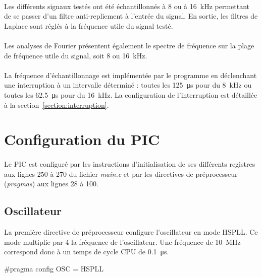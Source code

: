 \documentclass{article}
\begin{document}
    \paragraph{}
    Les différents signaux testés ont été échantillonnés à 8 ou à \SI{16}{\kilo\hertz} permettant de se passer d'un filtre anti-repliement à l'entrée du signal. En sortie, les filtres de Laplace sont réglés à la fréquence utile du signal testé.

    \paragraph{}
    Les analyses de Fourier présentent également le spectre de fréquence sur la plage de fréquence utile du signal, soit 8 ou \SI{16}{\kilo\hertz}.

    \paragraph{}
    La fréquence d'échantillonnage est implémentée par le programme en déclenchant une interruption à un intervalle déterminé : toutes les \SI{125}{\micro\second} pour du \SI{8}{\kilo\hertz} ou toutes les \SI{62.5}{\micro\second} pour du \SI{16}{\kilo\hertz}. La configuration de l'interruption est détaillée à la section~\ref{section:interruption}.



    \section{Configuration du PIC}
    \label{section:configuration}

    \paragraph{}
    Le PIC est configuré par les instructions d'initialisation de ses différents registres aux lignes 250 à 270 du fichier \emph{main.c} et par les directives de préprocesseur (\emph{pragmas}) aux lignes 28 à 100.

    \subsection{Oscillateur}
    La première directive de préprocesseur configure l'oscillateur en mode HSPLL. Ce mode multiplie par 4 la fréquence de l'oscillateur. Une fréquence de \SI{10}{\mega\hertz} correspond donc à un temps de cycle CPU de \SI{0.1}{\micro\second}.
    \begin{verbatimtab}
     [29]    #pragma config OSC = HSPLL
    \end{verbatimtab}
\end{document}
